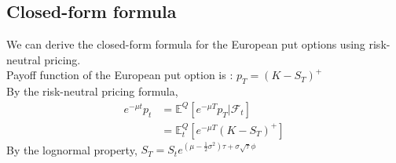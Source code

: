 \subsection{Closed-form formula}
We can derive the closed-form formula for the European put options using risk-neutral pricing.\\
Payoff function of the European put option is : $p_{T} = (K - S_{T})^{+}$\\
By the risk-neutral pricing formula,
\begin{equation}
\begin{split}
e^{-\mu t}p_{t}
&= \mathbb{E}^{Q}[e^{-\mu T}p_{T} | \mathcal{F}_{t}]\\
&= \mathbb{E}_{t}^{Q}[e^{-\mu T}(K - S_{T})^{+}]
\end{split}
\end{equation}
By the lognormal property, \quad
$S_{T} = S_{t}e^{(\mu - \frac{1}{2}\sigma^{2})\tau + \sigma\sqrt{\tau}\phi}$
